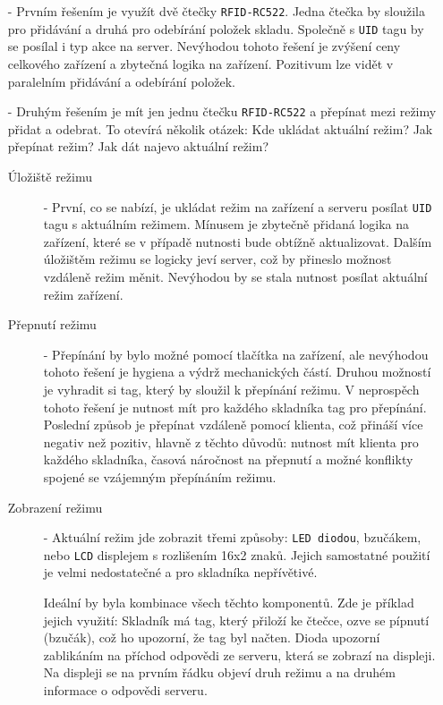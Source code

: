 \documentclass[czech,BP]{thesiskiv}
\begin{document}
				\begin{itemize}								
							
				\item [-] Prvním řešením je využít dvě čtečky \texttt{RFID-RC522}. Jedna čtečka by sloužila pro přidávání a druhá pro odebírání položek skladu.
				Společně s \texttt{UID} tagu by se posílal i typ akce na server. Nevýhodou tohoto řešení je zvýšení ceny celkového zařízení a zbytečná logika na zařízení.
				Pozitivum lze vidět v paralelním přidávání a odebírání položek.
				
							
				\item [-] Druhým řešením je mít jen jednu čtečku \texttt{RFID-RC522} a přepínat mezi režimy přidat a odebrat. 
				To otevírá několik otázek: Kde ukládat aktuální režim? Jak přepínat režim? Jak dát najevo aktuální režim?				
				
		
				\begin{description}				
				
				\item [Úložiště režimu] - První, co se nabízí, je ukládat režim na zařízení a serveru posílat \texttt{UID} tagu s aktuálním režimem.
				Mínusem je zbytečně přidaná logika na zařízení, které se v případě nutnosti bude obtížně aktualizovat.
				Dalším úložištěm režimu se logicky jeví server, což by přineslo možnost vzdáleně režim měnit. 
				Nevýhodou by se stala nutnost posílat aktuální režim zařízení.
				
				\item [Přepnutí režimu] - Přepínání by bylo možné pomocí tlačítka na zařízení, ale nevýhodou tohoto řešení je hygiena a výdrž mechanických částí. 			 
				Druhou možností je vyhradit si tag, který by sloužil k přepínání režimu. V neprospěch tohoto řešení je nutnost mít pro každého skladníka tag pro přepínání. 
				Poslední způsob je přepínat vzdáleně pomocí klienta, což přináší více negativ než pozitiv, hlavně z těchto důvodů: nutnost mít klienta pro každého skladníka, časová náročnost na přepnutí a možné konflikty spojené se vzájemným přepínáním režimu.
				
				\item [Zobrazení režimu] - Aktuální režim jde zobrazit třemi způsoby: \texttt{LED diodou}, bzučákem, nebo \texttt{LCD} displejem s rozlišením 16x2 znaků. Jejich samostatné použití je velmi nedostatečné a pro skladníka nepřívětivé. 


				Ideální by byla kombinace všech těchto komponentů. Zde je příklad jejich využití: Skladník má tag, který přiloží ke čtečce, ozve se pípnutí (bzučák), což ho upozorní, že tag byl načten. Dioda upozorní zablikáním na příchod odpovědi ze serveru, která se zobrazí na displeji. Na displeji se na prvním řádku objeví druh režimu a na druhém informace o odpovědi serveru.
				
				\end{description}				
				
				\end{itemize}
\end{document}
